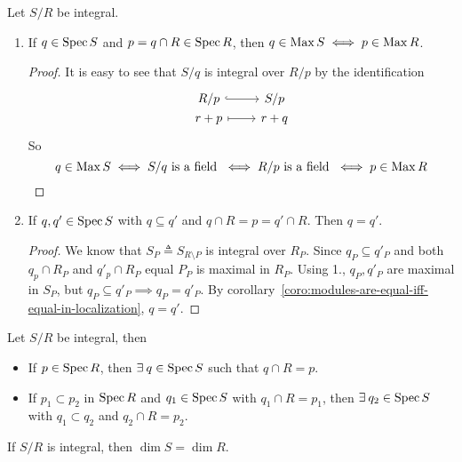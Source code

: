 \begin{prop}
  Let $S/R$ be integral.
  \begin{enumerate}
    \item If $q \in \operatorname{Spec} S$ and $p = q \cap R \in \operatorname{Spec} R$, then
      $q \in \operatorname{Max} S \iff p \in \operatorname{Max} R$.

    \begin{proof}
      It is easy to see that $S/q$ is integral over $R/p$ by the identification
      \[
        \begin{tikzcd}[column sep=0.8cm,row sep=0ex]
          R/p \arrow[r, hookrightarrow] & S/p \\
          r+p \arrow[r, mapsto] & r+q
        \end{tikzcd}
      \]
      So \[ q \in \operatorname{Max} S \iff S/q \text{ is a field } \iff R/p \text{ is a field } \iff p \in \operatorname{Max} R \]
    \end{proof}
    \item If $q, q' \in \operatorname{Spec} S$ with $q \subseteq q'$ and $q \cap R = p = q' \cap R$.
      Then $q = q'$.
    \begin{proof}
      We know that $S_P \triangleq S_{R \setminus P}$ is integral over $R_P$.
      Since $q_P \subseteq q'_P$ and both $q_p \cap R_P$ and $q'_p \cap R_P$
      equal $P_P$ is maximal in $R_P$. Using 1., $q_P, q'_P$ are maximal
      in $S_P$, but $q_P \subseteq q'_P \implies q_P = q'_P$.
      By corollary~\ref{coro:modules-are-equal-iff-equal-in-localization},
      $q = q'$.
    \end{proof}
  \end{enumerate}

\end{prop}

\begin{theorem}
  Let $S/R$ be integral, then
  \begin{itemize}
    \item If $p \in \operatorname{Spec} R$, then $\exists q \in \Spec S$ such that $q \cap R = p$.
    \item If $p_1 \subset p_2$ in $\operatorname{Spec} R$ and $q_1 \in \operatorname{Spec} S$ with $q_1 \cap R = p_1$,
      then $\exists q_2 \in \Spec S$ with $q_1 \subset q_2$ and $q_2 \cap R = p_2$.
  \end{itemize}
\end{theorem}

\begin{theorem}
  If $S/R$ is integral, then $\dim S = \dim R$.
\end{theorem}

